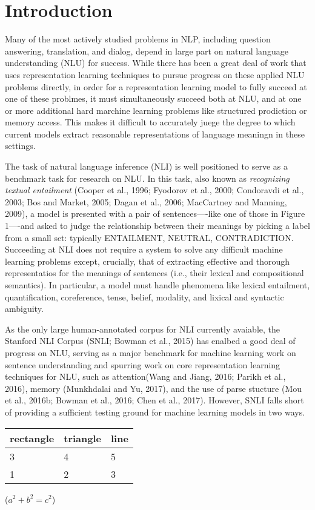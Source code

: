 \documentclass[12pt,UTF8,a4paper,twocolumn]{article}
\begin{document}
  \section{Introduction}
  Many of the most actively studied problems in NLP, including question answering, translation, and dialog, depend in large part on natural language understanding (NLU) for success. While there has been a great deal of work that uses representation learning techniques to pursue progress on these applied NLU problems directly, in order for a representation learning model to fully succeed at one of these problmes, it must simultaneously succeed both at NLU, and at one or more additional hard marchine learning problems like structured prodiction or memory access. This makes it difficult to accurately juege the degree to which current models extract reasonable representations of language meaningn in these settings.
  \par %
  The task of natural language inference (NLI) is well positioned to serve as a benchmark task for research on NLU. In this task, also known as \emph{recognizing textual entailment} {\color{blue}(Cooper et al., 1996; Fyodorov et al., 2000; Condoravdi et al., 2003; Bos and Market, 2005; Dagan et al., 2006; MacCartney and Manning, 2009)}, a model is presented with a pair of sentences----like one of those in Figure 1----and asked to judge the relationship between their meanings by picking a label from a small set: typically ENTAILMENT, NEUTRAL, CONTRADICTION. Succeeding at NLI does not require a system to solve any difficult machine learning problems except, crucially, that of extracting effective and thorough representatios for the meanings of sentences (i.e., their lexical and compositional semantics). In particular, a model must handle phenomena like lexical entailment, quantification, coreference, tense, belief, modality, and lixical and syntactic ambiguity.
  \par
  As the only large human-annotated corpus for NLI currently avaiable, the Stanford NLI Corpus (SNLI; {\color{blue}Bowman et al., 2015}) has enalbed a good deal of progress on NLU, serving as a major benchmark for machine learning work on sentence understanding and spurring work on core representation learning techniques for NLU, such as attention({\color{blue}Wang and Jiang, 2016; Parikh et al., 2016}), memory ({\color{blue}Munkhdalai and Yu, 2017}), and the use of parse stucture ({\color{blue}Mou et al., 2016b; Bowman et al., 2016; Chen et al., 2017}). However, SNLI falls short of providing a sufficient testing ground for machine learning models in two ways.
  \begin{table}
    \begin{tabular}{|mmm|}
      \hline
      rectangle & triangle & line \\
      \hline
      3 & 4 & 5 \\
      1 & 2 & 3 \\
      \hline
    \end{tabular}
    \qquad
    ($a^2 + b^2 = c^2$) %
  \end{table}
\end{document}
